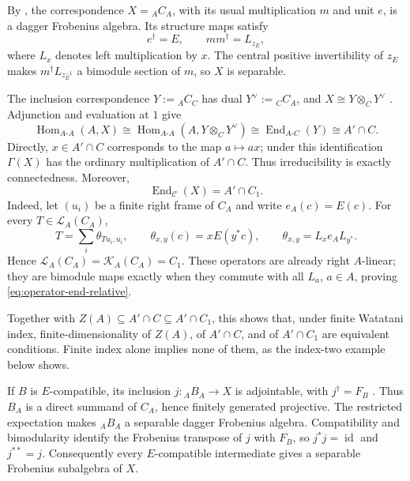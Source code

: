 \documentclass[11pt]{amsart}
\theoremstyle{definition}
\theoremstyle{remark}
\newcommand{\C}{\mathcal C}
\DeclareMathOperator{\Hom}{Hom}
\DeclareMathOperator{\End}{End}
\DeclareMathOperator{\id}{id}
\begin{document}
By \cite[Lemma~3.11]{CHPJP}, the correspondence $X={}_AC_A$,
with its usual multiplication $m$ and unit $e$, is a dagger Frobenius
algebra.  Its structure maps satisfy
\begin{equation}\label{eq:operator-frobenius-data}
 e^\dagger=E,\qquad mm^\dagger=L_{z_E},
\end{equation}
where $L_x$ denotes left multiplication by $x$.
The central positive invertibility of $z_E$ makes
$m^\dagger L_{z_E^{-1}}$ a bimodule section of $m$, so $X$ is separable.

The inclusion correspondence $Y:={}_AC_C$ has dual
$Y^\vee:={}_CC_A$, and $X\cong Y\otimes_CY^\vee$
\cite[Example~3.25]{CHPJP}.  Adjunction and evaluation at $1$ give
\begin{equation}\label{eq:operator-connected-relative}
 \Hom_{A\text{-}A}(A,X)
 \cong\Hom_{A\text{-}A}(A,Y\otimes_CY^\vee)
 \cong\End_{A\text{-}C}(Y)
 \cong A'\cap C.
\end{equation}
Directly, $x\in A'\cap C$ corresponds to the map $a\mapsto ax$;
under this identification $\Gamma(X)$ has the ordinary multiplication
of $A'\cap C$.  Thus irreducibility is exactly connectedness.
Moreover,
\begin{equation}\label{eq:operator-end-relative}
 \End_{\C}(X)=A'\cap C_1.
\end{equation}
Indeed, let $(u_i)$ be a finite right frame of $C_A$ and write
$e_A(c)=E(c)$.  For every $T\in\mathcal L_A(C_A)$,
\[
 T=\sum_i\theta_{Tu_i,u_i},\qquad
 \theta_{x,y}(c)=xE(y^*c),\qquad
 \theta_{x,y}=L_xe_AL_{y^*}.
\]
Hence $\mathcal L_A(C_A)=\mathcal K_A(C_A)=C_1$.
These operators are already right $A$-linear; they are bimodule maps
exactly when they commute with all $L_a$, $a\in A$, proving
\eqref{eq:operator-end-relative}.

Together with $Z(A)\subseteq A'\cap C\subseteq A'\cap C_1$, this shows
that, under finite Watatani index, finite-dimensionality of $Z(A)$,
of $A'\cap C$, and of $A'\cap C_1$ are equivalent conditions.
Finite index alone implies none of them, as the index-two example below
shows.

If $B$ is $E$-compatible, its inclusion $j:{}_AB_A\to X$ is
adjointable, with $j^\dagger=F_B$
\cite[Proposition~10.5]{GhoshPalcouxLattices}.  Thus $B_A$ is a direct
summand of $C_A$, hence finitely generated projective.  The restricted
expectation makes ${}_AB_A$ a separable dagger Frobenius algebra.
Compatibility and bimodularity identify the Frobenius transpose of $j$
with $F_B$, so $j^*j=\id$ and $j^{**}=j$.  Consequently every
$E$-compatible intermediate gives a separable Frobenius subalgebra of $X$.
\end{document}
